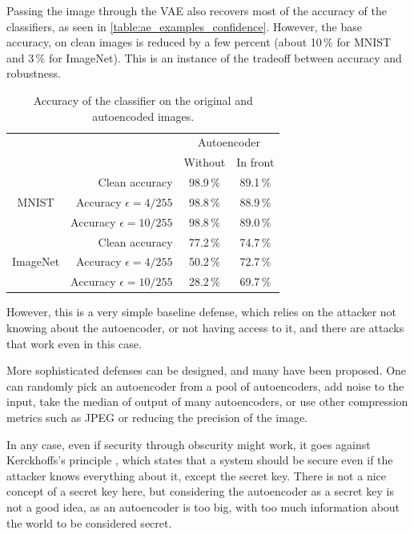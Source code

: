 \documentclass[]{scrarticle}
\begin{document}
Passing the image through the VAE also recovers most of the accuracy
of the classifiers, as seen in \autoref{table:ae_examples_confidence}.
However, the base accuracy, on clean images is reduced by a few percent
(about 10\,\% for MNIST and 3\,\% for ImageNet).
This is an instance of the tradeoff between accuracy and robustness.

\begin{table}[h]
  \centering

    \begin{tabular}{c|r|cc}
    & & \multicolumn{2}{c}{Autoencoder} \\
    & & Without & In front \\
    \hline
    \multirow{3}{*}{MNIST}
    &  Clean accuracy			& 98.9\,\%	& 89.1\,\%	\\
    &  Accuracy $\epsilon=4/255$	& 98.8\,\%	& 88.9\,\%	\\
    &  Accuracy $\epsilon=10/255$	& 98.8\,\%	& 89.0\,\%	\\
    \hline
    \multirow{3}{*}{ImageNet}
    &  Clean accuracy			& 77.2\,\%	& 74.7\,\%	\\
    &  Accuracy $\epsilon=4/255$	& 50.2\,\%	& 72.7\,\%	\\
    &  Accuracy $\epsilon=10/255$	& 28.2\,\%	& 69.7\,\%	\\
  \end{tabular}

  \caption{Accuracy of the classifier on the original and autoencoded images.}
  \label{table:ae_examples_confidence}
\end{table}

However, this is a very simple baseline defense, which relies on the attacker
not knowing about the autoencoder, or not having access to it,
and there are attacks that work even in this case.

More sophisticated defenses can be designed, and many have been proposed.
One can randomly pick an autoencoder from a pool of autoencoders,
add noise to the input, take the median of output of many autoencoders,
or use other compression metrics such as JPEG or reducing the precision of the image.

In any case, even if security through obscurity might work,
it goes against Kerckhoffs's principle \cite{kerckhoffs1883cryptographie},
which states that a system should be secure even if the attacker
knows everything about it, except the secret key.
There is not a nice concept of a secret key here,
but considering the autoencoder as a secret key is not a good idea,
as an autoencoder is too big, with too much information about the world
to be considered secret.
\end{document}
